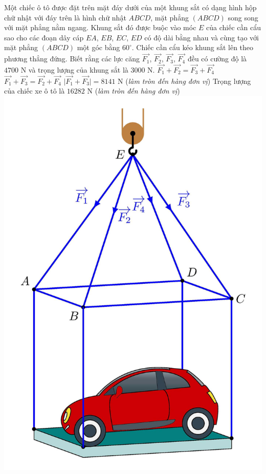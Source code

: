 \begin{ex}
	\immini
	{
	Một chiếc ô tô được đặt trên mặt đáy dưới của một khung sắt có dạng hình hộp chữ nhật với đáy trên là hình chữ nhật $ABCD$, mặt phẳng $(ABCD)$ song song với mặt phẳng nằm ngang. Khung sắt đó được buộc vào móc $E$ của chiếc cần cẩu sao cho các đoạn dây cáp $EA$, $EB$, $EC$, $ED$ có độ dài bằng nhau và cùng tạo với mặt phẳng $(ABCD)$ một góc bằng $60^\circ$. Chiếc cần cẩu kéo khung sắt lên theo phương thẳng đứng. Biết rằng các lực căng $\vec{F_1}$, $\vec{F_2}$, $\vec{F_3}$, $\vec{F_4}$ đều có cường độ là $4700$ N và trọng lượng của khung sắt là $3000$ N.
	\choiceTF
	{$\vec{F_1}+\vec{F_2}=\vec{F_3}+\vec{F_4}$}
	{\True $\vec{F_1}+\vec{F_3}=\vec{F_2}+\vec{F_4}$}
	{\True $\big|\vec{F_1}+\vec{F_3}\big|=8141$ N (\textit{làm tròn đến hàng đơn vị})}
	{Trọng lượng của chiếc xe ô tô là $16282$ N (\textit{làm tròn đến hàng đơn vị})}
	}
	{\hspace{1cm}
	\includegraphics[scale=.09]{images/xe-1.jpg}
}
\end{ex}
